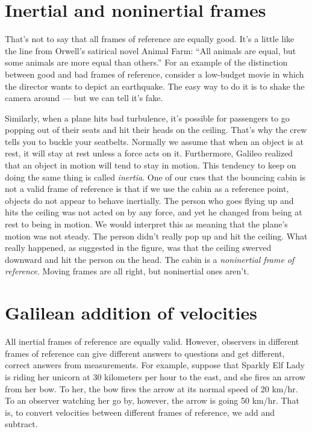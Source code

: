\section{Inertial and noninertial frames}

That's not to say that all frames of reference are equally good. It's a little like the line from
Orwell's satirical novel Animal Farm: ``All animals are equal, but some animals are more equal than others.''
For an example of the distinction between good and bad frames of reference, consider a low-budget movie in which
the director wants to depict an earthquake.
The easy way to do it is to shake the camera around --- but we can tell it's fake.

\begin{figure}[h]\label{fig:plane-noninertial}
\end{figure}

Similarly, when a plane hits bad turbulence, it's possible for passengers to go popping out of their seats and hit their
heads on the ceiling. That's why the crew tells you to buckle your seatbelts. Normally we assume that when an
object is at rest, it will stay at rest unless a force acts on it. Furthermore, Galileo realized that
an object in motion will tend
to stay in motion. This tendency to keep on doing the same thing is called \emph{inertia}.
One of our cues that the bouncing cabin is not a valid frame of reference is that if we use the cabin as a
reference point, objects do not appear to behave inertially. The person who goes flying up and hits the ceiling
was not acted on by any force, and yet he changed from being at rest to being in motion. We would interpret this
as meaning that the plane's motion was not steady. The person didn't really pop up and hit the ceiling. What really
happened, as suggested in the figure, was that the ceiling swerved downward and hit the person on the head. The cabin is a \emph{noninertial frame
of reference}. Moving frames are all right, but noninertial ones aren't.

\section{Galilean addition of velocities}\label{sec:galilean-velocity-addition}

All inertial frames of reference are equally valid. However, observers in different frames of reference
can give different answers to questions and get different, correct answers from measurements. For example,
suppose that Sparkly Elf Lady is riding her unicorn at 30 kilometers per hour to the east, and she fires
an arrow from her bow. To her, the bow fires the arrow at its normal speed of 20 km/hr. To an observer
watching her go by, however, the arrow is going 50 km/hr. That is, to convert velocities between different
frames of reference, we add and subtract.

